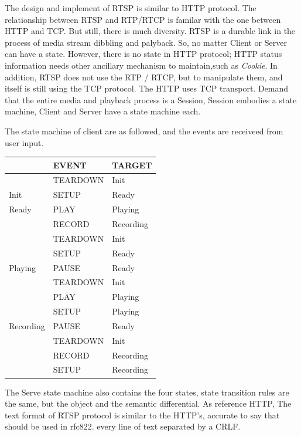 {The design and implement of RTSP is similar to HTTP protocol. The relationship between RTSP and RTP/RTCP is familar with the one between HTTP and TCP. But still, there is much diversity. RTSP is a durable link in the process of media stream dibbling and palyback. So, no matter Client or Server can have a state. However, there is no state in HTTP protocol; HTTP status information needs other ancillary mechanism to maintain,such as \emph{Cookie}. In addition, RTSP does not use the RTP / RTCP, but to manipulate them, and itself is still using the TCP protocol. The HTTP uses TCP transport.
Demand that the entire media and playback process is a Session, Session embodies a state machine, Client and Server have a state machine each.

The state machine of client are as followed, and the events are receiveed from user input.
\begin{center}
\begin{tabular}{@{}lll@{}}\toprule
                    &       EVENT                &    TARGET \\ \midrule
                    &       TEARDOWN             &     Init\\  
   Init             &       SETUP                &      Ready \\ \midrule
   Ready            &       PLAY                 &      Playing \\
                    &       RECORD               &     Recording\\
                    &       TEARDOWN             &      Init\\
                    &       SETUP                &      Ready\\\midrule
   Playing          &      PAUSE                 &      Ready\\ 
                    &     TEARDOWN               &      Init\\
                    &      PLAY                  &      Playing\\
                    &     SETUP                  &      Playing \\\midrule
   Recording        &      PAUSE                 &      Ready\\ 
                    &     TEARDOWN               &      Init\\
                    &     RECORD                 &      Recording\\
                    &      SETUP                 &      Recording \\\bottomrule
\end{tabular}
\end{center}
The Serve state machine also contains the four states, state transition rules are the same, but the object and the semantic differential.
As reference HTTP, The text format of RTSP protocol is similar to the HTTP's, accurate to say that should be used in rfc822. every line of text separated by a CRLF.

}

